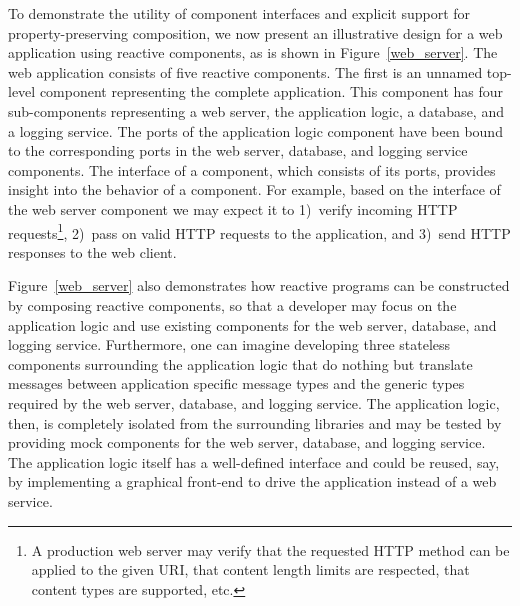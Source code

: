 To demonstrate the utility of component interfaces and explicit support for property-preserving composition, we now present an illustrative design for a web application using reactive components, as is shown in Figure~\ref{web_server}.
The web application consists of five reactive components.
The first is an unnamed top-level component representing the complete application.
This component has four sub-components representing a web server, the application logic, a database, and a logging service.
The ports of the application logic component have been bound to the corresponding ports in the web server, database, and logging service components.
The interface of a component, which consists of its ports, provides insight into the behavior of a component.
For example, based on the interface of the web server component we may expect it to 1)~verify incoming HTTP requests\footnote{A production web server may verify that the requested HTTP method can be applied to the given URI, that content length limits are respected, that content types are supported, etc.}, 2)~pass on valid HTTP requests to the application, and 3)~send HTTP responses to the web client.

Figure~\ref{web_server} also demonstrates how reactive programs can be constructed by composing reactive components, so that a developer may focus on the application logic and use existing components for the web server, database, and logging service.
Furthermore, one can imagine developing three stateless components surrounding the application logic that do nothing but translate messages between application specific message types and the generic types required by the web server, database, and logging service.
The application logic, then, is completely isolated from the surrounding libraries and may be tested by providing mock components for the web server, database, and logging service.
The application logic itself has a well-defined interface and could be reused, say, by implementing a graphical front-end to drive the application instead of a web service.

